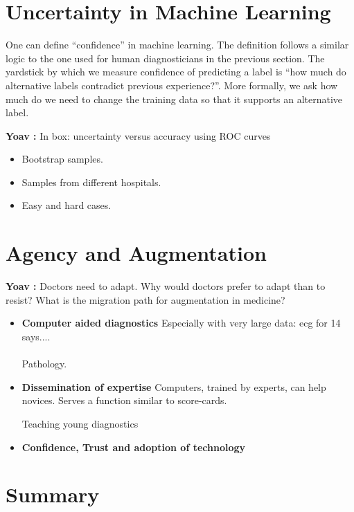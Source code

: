 \documentclass[10pt]{article}
\newcommand{\comment}[3]{{\color{#1} {\bf #2 :} #3}}
\newcommand{\yoav}[1]{\comment{red}{Yoav}{#1}}
\begin{document}
\section*{Uncertainty in Machine Learning}

One can define ``confidence'' in machine learning. The definition follows a
similar logic to the one used for human diagnosticians in the previous
section. The yardstick by which we measure confidence of predicting a
label is ``how much do alternative labels contradict previous
experience?''.
More formally, we ask how much do we need to change the training data
so that it supports an alternative label.

\yoav{In box: uncertainty versus accuracy using ROC curves}

\begin{itemize}
  \item Bootstrap samples.
  \item Samples from different hospitals.
  \item Easy and hard cases.
  \end{itemize}

\section*{Agency and Augmentation}
\yoav{Doctors need to adapt. Why would doctors prefer to adapt than to
  resist? What is the migration path for augmentation in medicine?}
\begin{itemize}
\item{\bf Computer aided diagnostics}
  Especially with very large data: ecg for 14 says.... \\
  ~\\

Pathology.

\item {\bf Dissemination of expertise}
Computers, trained by experts, can help novices.  Serves a function
similar to score-cards.

Teaching young diagnostics
\item { \bf Confidence, Trust and adoption of technology}
\end{itemize}

\section*{Summary}

 


\end{document}
